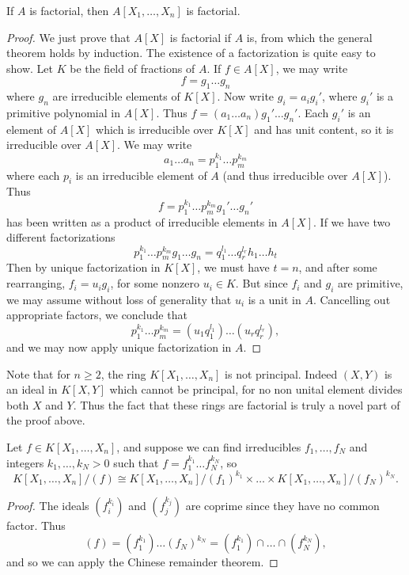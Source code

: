 \begin{corollary}
    If $A$ is factorial, then $A[X_1, \dots, X_n]$ is factorial.
\end{corollary}
\begin{proof}
    We just prove that $A[X]$ is factorial if $A$ is, from which the general theorem holds by induction. The existence of a factorization is quite easy to show. Let $K$ be the field of fractions of $A$. If $f \in A[X]$, we may write
    \[ f = g_1 \dots g_n \]
    where $g_n$ are irreducible elements of $K[X]$. Now write $g_i = a_i g_i'$, where $g_i'$ is a primitive polynomial in $A[X]$. Thus $f = (a_1 \dots a_n) g_1' \dots g_n'$. Each $g_i'$ is an element of $A[X]$ which is irreducible over $K[X]$ and has unit content, so it is irreducible over $A[X]$. We may write
    \[ a_1 \dots a_n = p_1^{k_1} \dots p_m^{k_m} \]
    where each $p_i$ is an irreducible element of $A$ (and thus irreducible over $A[X]$). Thus
    \[ f = p_1^{k_1} \dots p_m^{k_m} g_1' \dots g_n' \]
    has been written as a product of irreducible elements in $A[X]$. If we have two different factorizations
    \[ p_1^{k_1} \dots p_m^{k_m}  g_1 \dots g_n = q_1^{l_1} \dots q_r^{l_r} h_1 \dots h_t \]
    Then by unique factorization in $K[X]$, we must have $t = n$, and after some rearranging, $f_i = u_i g_i$, for some nonzero $u_i \in K$. But since $f_i$ and $g_i$ are primitive, we may assume without loss of generality that $u_i$ is a unit in $A$. Cancelling out appropriate factors, we conclude that
    \[ p_1^{k_1} \dots p_m^{k_m} = (u_1 q_1^{l_1}) \dots (u_r q_r^{l_r}), \]
    and we may now apply unique factorization in $A$.
\end{proof}

Note that for $n \geq 2$, the ring $K[X_1, \dots, X_n]$ is not principal. Indeed $(X,Y)$ is an ideal in $K[X,Y]$ which cannot be principal, for no non unital element divides both $X$ and $Y$. Thus the fact that these rings are factorial is truly a novel part of the proof above.

\begin{corollary}
    Let $f \in K[X_1, \dots, X_n]$, and suppose we can find irreducibles $f_1, \dots, f_N$ and integers $k_1, \dots, k_N > 0$ such that $f = f_1^{k_1} \dots f_N^{k_N}$, so
    \[ K[X_1,\dots,X_n] / (f) \cong K[X_1,\dots,X_n] / (f_1)^{k_1} \times \dots \times K[X_1,\dots,X_n] / (f_N)^{k_N}. \]
\end{corollary}
\begin{proof}
    The ideals $(f_i^{k_i})$ and $(f_j^{k_j})$ are coprime since they have no common factor. Thus
    \[ (f) = (f_1^{k_1}) \dots (f_N)^{k_N} = (f_1^{k_1}) \cap \dots \cap (f_N^{k_N}), \]
    and so we can apply the Chinese remainder theorem.
\end{proof}





